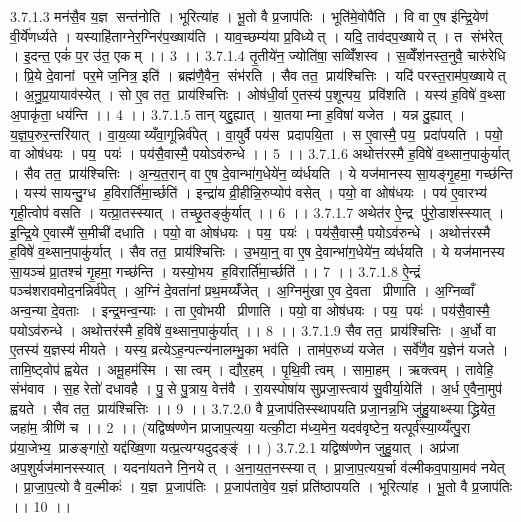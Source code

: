 3.7.1.3
मन॑सै॒व य॒ज्ञ सन्त॑नोति । भूरित्या॑ह । भू॒तो वै प्र॒जाप॑तिः । भूति॑मे॒वोपै॑ति । वि वा ए॒ष इ॑न्द्रि॒येण॑ वी॒र्ये॑णर्ध्यते । यस्याहि॑ताग्नेर॒ग्निर॑प॒ख्षाय॑ति । याव॒च्छम्य॑या प्र॒विध्येत् । यदि॒ ताव॑दप॒ख्षायेत् । त संभ॑रेत् । इ॒दन्त॒ एकं॑ प॒र उ॑त॒ एकम् ।। 3 ।।
3.7.1.4
तृ॒तीये॑न॒ ज्योति॑षा॒ सव्विँ॑शस्व । स॒व्वेँश॑नस्त॒नुवै॒ चारु॑रेधि । प्रि॒ये दे॒वानां पर॒मे ज॒नित्र॒ इति॑ । ब्रह्म॑णै॒वैन॒॒ संभ॑रति । सैव तत॒ प्राय॑श्चित्तिः । यदि॑ परस्त॒राम॑प॒ख्षायेत् । अ॒नु॒प्र॒यायाव॑स्येत् । सो ए॒व तत॒ प्राय॑श्चित्तिः । ओष॑धी॒र्वा ए॒तस्य॑ प॒शून्पय॒ प्रवि॑शति । यस्य॑ ह॒विषे॑ व॒थ्सा अ॒पाकृ॑ता॒ धय॑न्ति ।। 4 ।।
3.7.1.5
तान् यद्दु॒ह्यात् । या॒तयाम्ना ह॒विषा॑ यजेत । यन्न दु॒ह्यात् । य॒ज्ञ॒प॒रुर॒न्तरि॑यात् । वा॒य॒व्याय्यँवा॒गून्निर्व॑पेत् । वा॒युर्वै पय॑स प्रदापयि॒ता । स ए॒वास्मै॒ पय॒ प्रदा॑पयति । पयो॒ वा ओष॑धयः । पय॒ पयः॑ । पय॑सै॒वास्मै॒ पयोऽव॑रुन्धे ।। 5 ।।
3.7.1.6
अथोत्त॑रस्मै ह॒विषे॑ व॒थ्सान॒पाकु॑र्यात् । सैव तत॒ प्राय॑श्चित्तिः । अ॒न्य॒त॒रान् वा ए॒ष दे॒वान्भा॑ग॒धेये॑न॒ व्य॑र्धयति । ये यज॑मानस्य सा॒यङ्गृ॒हमा॒ गच्छ॑न्ति । यस्य॑ सायन्दु॒ग्ध ह॒विरार्ति॑मा॒र्च्छति॑ । इन्द्रा॑य व्री॒हीन्नि॒रुप्योप॑ वसेत् । पयो॒ वा ओष॑धयः । पय॑ ए॒वारभ्य॑ गृही॒त्वोप॑ वसति । यत्प्रा॒तस्स्यात् । तच्छृ॒तङ्कु॑र्यात् ।। 6 ।।
3.7.1.7
अथेत॑र ऐ॒न्द्र पु॑रो॒डाश॑स्स्यात् । इ॒न्द्रि॒ये ए॒वास्मै॑ स॒मीची॑ दधाति । पयो॒ वा ओष॑धयः । पय॒ पयः॑ । पय॑सै॒वास्मै॒ पयोऽव॑रुन्धे । अथोत्त॑रस्मै ह॒विषे॑ व॒थ्सान॒पाकु॑र्यात् । सैव तत॒ प्राय॑श्चित्तिः । उ॒भया॒न्॒ वा ए॒ष दे॒वान्भा॑ग॒धेये॑न॒ व्य॑र्धयति । ये यज॑मानस्य सा॒यञ्च॑ प्रा॒तश्च॑ गृ॒हमा॒ गच्छ॑न्ति । यस्यो॒भय॑ ह॒विरार्ति॑मा॒र्च्छति॑ ।। 7 ।।
3.7.1.8
ऐ॒न्द्रं पञ्च॑शरावमोद॒नन्निर्व॑पेत् । अ॒ग्निं दे॒वता॑नां प्रथ॒मय्यँ॑जेत् । अ॒ग्निमु॑खा ए॒व दे॒वता प्रीणाति । अ॒ग्निव्वाँ अन्व॒न्या दे॒वताः । इन्द्र॒मन्व॒न्याः । ता ए॒वोभयी प्रीणाति । पयो॒ वा ओष॑धयः । पय॒ पयः॑ । पय॑सै॒वास्मै॒ पयोऽव॑रुन्धे । अथोत्तर॑स्मै ह॒विषे॑ व॒थ्सान॒पाकु॑र्यात् ।। 8 ।।
3.7.1.9
सैव तत॒ प्राय॑श्चित्तिः । अ॒र्धो वा ए॒तस्य॑ य॒ज्ञस्य॑ मीयते । यस्य॒ व्रत्येऽह॒न्पत्न्य॑नालम्भु॒का भव॑ति । ताम॑प॒रुध्य॑ यजेत । सर्वे॑णै॒व य॒ज्ञेन॑ यजते । तामि॒ष्ट्वोप॑ ह्वयेत । अमू॒हम॑स्मि । सा त्वम् । द्यौर॒हम् । पृ॒थि॒वी त्वम् । सामा॒हम् । ऋक्त्वम् । तावेहि॒ संभ॑वाव । स॒ह रेतो॑ दधावहै । पु॒॒से पु॒त्राय॒ वेत्त॑वै । रा॒यस्पोषा॑य सुप्रजा॒स्त्वाय॑ सु॒वीर्या॒येति॑ । अ॒र्ध ए॒वैना॒मुप॑ ह्वयते । सैव तत॒ प्राय॑श्चित्तिः ।। 9 ।।
3.7.2.0
वै प्र॒जाप॑तिस्स्थापयति प्रजा॒नन्न॒भि जु॑हु॒याथ्स्याद्ध्रियेत॒ जहा॑म॒ त्रीणि॑ च ।। 2 ।। (यद्विष्ष॑ण्णेन प्राजाप॒त्यया॒ यत्की॒टा म॑ध्य॒मेन॒ यदव॑वृष्टेन॒ यत्पूर्व॑स्या॒य्यँत्पु॒रा प्र॑या॒जेभ्य॒ प्राङङ्गा॑रो॒ यद्द॑ख्षि॒णा यत्प्र॒त्यग्यदुदङ्ङ्॑ ।। )
3.7.2.1
यद्विष्ष॑ण्णेन जुहु॒यात् । अप्र॑जा अप॒शुर्यज॑मानस्स्यात् । यदना॑यतने नि॒नयेत् । अ॒ना॒य॒त॒नस्स्यात् । प्रा॒जा॒प॒त्यय॒र्चा व॑ल्मीकव॒पाया॒मव॑ नयेत् । प्रा॒जा॒प॒त्यो वै व॒ल्मीकः॑ । य॒ज्ञ प्र॒जाप॑तिः । प्र॒जाप॑तावे॒व य॒ज्ञं प्रति॑ष्ठापयति । भूरित्या॑ह । भू॒तो वै प्र॒जाप॑तिः ।। 10 ।।
